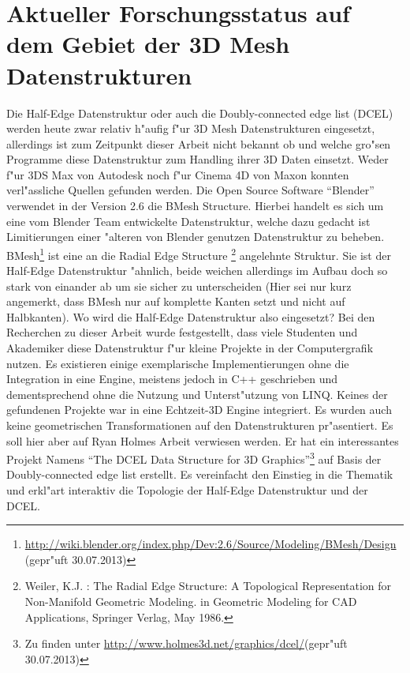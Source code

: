 \documentclass[pagesize, paper=a4, fontsize=12pt,titlepage=true, headings=small, headnosepline, abstractoff, liststotoc, nochapterprefix, plainheadsepline]{scrreprt}
\newcommand{\HES}{Half-Edge Datenstruktur }
\begin{document}
	\section {Aktueller Forschungsstatus auf dem Gebiet der 3D Mesh Datenstrukturen}
		Die \HES oder auch die Doubly-connected edge list (DCEL) werden heute zwar relativ h"aufig f"ur 3D Mesh Datenstrukturen eingesetzt, allerdings ist zum Zeitpunkt dieser Arbeit nicht bekannt ob und welche gro"sen Programme diese Datenstruktur zum Handling ihrer 3D Daten einsetzt. Weder f"ur 3DS Max von Autodesk noch f"ur Cinema 4D von Maxon konnten verl"assliche Quellen gefunden werden. Die Open Source Software "`Blender"' verwendet in der Version 2.6 die BMesh Structure. Hierbei handelt es sich um eine vom Blender Team entwickelte Datenstruktur, welche dazu gedacht ist Limitierungen einer "alteren von Blender genutzen Datenstruktur zu beheben. BMesh\footnote{\url{http://wiki.blender.org/index.php/Dev:2.6/Source/Modeling/BMesh/Design} (gepr"uft 30.07.2013)}  ist eine an die Radial Edge Structure \footnote{Weiler, K.J. : The Radial Edge Structure: A Topological Representation for Non-Manifold Geometric Modeling. in Geometric Modeling for CAD Applications, Springer Verlag, May 1986.} angelehnte Struktur. Sie ist der \HES "ahnlich, beide weichen allerdings im Aufbau doch so stark von einander ab um sie sicher zu unterscheiden (Hier sei nur kurz angemerkt, dass BMesh nur auf komplette Kanten setzt und nicht auf Halbkanten). Wo wird die \HES also eingesetzt? Bei den Recherchen zu dieser Arbeit wurde festgestellt, dass viele Studenten und Akademiker diese Datenstruktur f"ur kleine Projekte in der Computergrafik nutzen. Es existieren einige exemplarische Implementierungen ohne die Integration in eine Engine, meistens jedoch in C++ geschrieben und dementsprechend ohne die Nutzung und Unterst"utzung von LINQ. Keines der gefundenen Projekte war in eine Echtzeit-3D Engine integriert. Es wurden auch keine geometrischen Transformationen auf den Datenstrukturen pr"asentiert. Es soll hier aber auf Ryan Holmes Arbeit \cite{Holmes.2012} verwiesen werden. Er hat ein interessantes Projekt Namens "`The DCEL Data Structure for 3D Graphics"'\footnote{Zu finden unter \url{http://www.holmes3d.net/graphics/dcel/}(gepr"uft 30.07.2013)} auf Basis der Doubly-connected edge list erstellt. Es vereinfacht den Einstieg in die Thematik und erkl"art interaktiv die Topologie der \HES und der DCEL.
\newline
\end{document}
